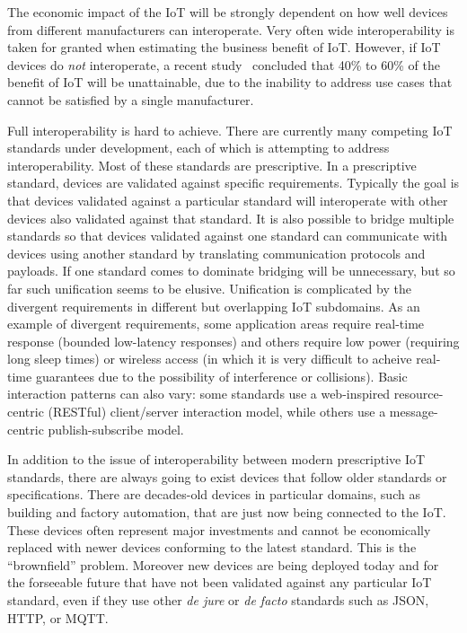 The economic impact of the IoT will be strongly dependent on how well devices from 
different manufacturers can interoperate.
Very often wide interoperability is taken for granted when estimating the business
benefit of IoT. 
However, if IoT devices do \emph{not} interoperate,
a recent study~\cite{McK2015a} concluded that 40\% to 60\% of the 
benefit of IoT will be unattainable,
due to the inability to address use cases that cannot be satisfied by a single manufacturer.

Full interoperability is hard to achieve.
There are currently many competing IoT standards under development,
each of which is attempting to address interoperability.
Most of these standards are prescriptive.
In a prescriptive standard,
devices are validated against specific requirements.
Typically the goal is that devices validated against 
a particular standard will interoperate with
other devices also validated against that standard.
It is also possible to bridge multiple standards so that
devices validated against one standard can communicate with
devices using another standard by translating communication protocols and payloads.
If one standard comes to dominate bridging will be unnecessary,
but so far such unification seems to be elusive. 
Unification is complicated by the
divergent requirements in different but overlapping IoT subdomains.
As an example of divergent requirements,
some application areas require real-time response (bounded low-latency responses)
and others require low power (requiring long sleep times) or wireless access
(in which it is very difficult to acheive real-time guarantees due to the
possibility of interference or collisions).
Basic interaction patterns can also vary: some standards use
a web-inspired resource-centric (RESTful) client/server interaction model,
while others use a message-centric publish-subscribe model.

In addition to the issue of interoperability between modern prescriptive IoT standards,
there are always going to exist devices that follow older standards or specifications.
There are decades-old devices in particular domains, such as building and factory
automation, that are just now being connected to the IoT.
These devices often represent major investments and cannot be economically replaced with newer
devices conforming to the latest standard.
This is the ``brownfield'' problem.
Moreover new devices are being deployed today and for the forseeable future 
that have not been validated
against any particular IoT standard,
even if they use other \textit{de jure} or \textit{de facto} standards such as JSON, HTTP, or MQTT.

